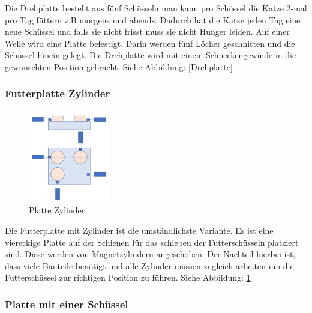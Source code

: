 Die Drehplatte besteht aus fünf Schüsseln man kann pro Schüssel die Katze 2-mal pro Tag füttern z.B morgens und abends. Dadurch hat die Katze jeden Tag eine neue Schüssel und falls sie nicht frisst muss sie nicht Hunger leiden. Auf einer Welle wird eine Platte befestigt. 
Darin werden fünf Löcher geschnitten und die Schüssel hinein gelegt. Die Drehplatte wird mit einem Schneckengewinde in die gewünschten Position gebracht. Siehe Abbildung: \ref{Drehplatte} 

\subsubsection{Futterplatte Zylinder}

\begin{figure}
\vspace{-20pt}
  \begin{center}
    \includegraphics[width=0.32\textwidth]{Bilder/Powerpoint/Platte_Zylinder}
  \end{center}
  \caption{Platte Zylinder}
  \label{Platte Zylinder}
\vspace{-60pt}
\end{figure}

Die Futterplatte mit Zylinder ist die umständlichste Variante. Es ist eine viereckige Platte auf der Schienen für das schieben der Futterschüsseln platziert sind. Diese werden von Magnetzylindern angeschoben. Der Nachteil hierbei ist, dass viele Bauteile benötigt und alle Zylinder müssen zugleich arbeiten um die Futterschüssel zur richtigen Position zu führen. Siehe Abbildung: \ref{Platte Zylinder} 

\newpage


\subsubsection{Platte mit einer Schüssel}

